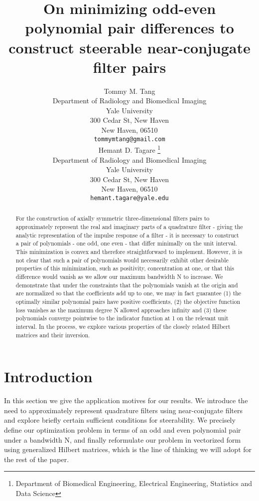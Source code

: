 \documentclass{article}
\title{On minimizing odd-even polynomial pair differences to construct steerable near-conjugate filter pairs}
\author{
 Tommy M. Tang  \\
  Department of Radiology and Biomedical Imaging\\
  Yale University\\
   300 Cedar St, New Haven\\
  New Haven, 06510 \\
  \texttt{tommymtang@gmail.com} \\
   \And
 Hemant D. Tagare \thanks{ Department of Biomedical Engineering, Electrical Engineering, Statistics and Data Science} \\
 Department of Radiology and Biomedical Imaging\\
 Yale University\\
 300 Cedar St, New Haven\\
  New Haven, 06510 \\
  \texttt{hemant.tagare@yale.edu} \\
}
\theoremstyle{definition}
\theoremstyle{remark}
\numberwithin{equation}{section}
\begin{document}
\maketitle

\begin{abstract}
For the construction of axially symmetric three-dimensional filters pairs to approximately represent the real and imaginary parts of a quadrature filter - giving the analytic representation of the impulse response of a filter - it is necessary to construct a pair of polynomials - one odd, one even - that differ minimally on the unit interval. This minimization is convex and therefore straightforward to implement. However, it is not clear that such a pair of polynomials would necessarily exhibit other desirable properties of this minimization, such as positivity, concentration at one, or that this difference would vanish as we allow our maximum bandwidth N to increase. We demonstrate that under the constraints that the polynomials vanish at the origin and are normalized so that the coefficients add up to one, we may in fact guarantee (1) the optimally similar polynomial pairs have positive coefficients, (2) the objective function loss vanishes as the maximum degree N allowed approaches infinity and (3) these polynomials converge pointwise to the indicator function at 1 on the relevant unit interval. In the process, we explore various properties of the closely related Hilbert matrices and their inversion. 
\end{abstract}




\section{Introduction}
In this section we give the application motives for our results. We introduce the need to approximately represent quadrature filters using near-conjugate filters and explore briefly certain sufficient conditions for steerability. We precisely define our optimization problem in terms of an odd and even polynomial pair under a bandwidth N, and finally reformulate our problem in vectorized form using generalized Hilbert matrices, which is the line of thinking we will adopt for the rest of the paper. 
\end{document}
